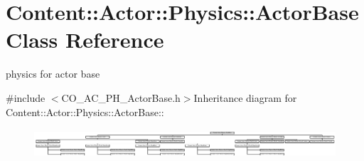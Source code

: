 \hypertarget{classContent_1_1Actor_1_1Physics_1_1ActorBase}{
\section{Content::Actor::Physics::ActorBase Class Reference}
\label{classContent_1_1Actor_1_1Physics_1_1ActorBase}
}


physics for actor base  


{\ttfamily \#include $<$CO\_\-AC\_\-PH\_\-ActorBase.h$>$}Inheritance diagram for Content::Actor::Physics::ActorBase::\begin{figure}[H]
\begin{center}
\leavevmode
\includegraphics[height=1.08527cm]{classContent_1_1Actor_1_1Physics_1_1ActorBase}
\end{center}
\end{figure}
